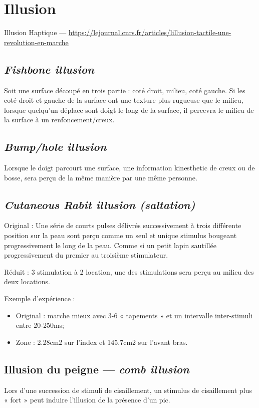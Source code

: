 \section{Illusion}
Illusion Haptique --- \url{https://lejournal.cnrs.fr/articles/lillusion-tactile-une-revolution-en-marche}\par

\subsection{ \textit{Fishbone illusion}}
Soit une surface découpé en trois partie : coté droit, milieu, coté gauche. Si les coté droit et gauche de la surface ont une texture plus rugueuse que le milieu, lorsque quelqu’un déplace sont doigt le long de la surface, il percevra le milieu de la surface à un renfoncement/creux.\par

\subsection{ \textit{Bump/hole illusion}}
Lorsque le doigt parcourt une surface, une information kinesthetic de creux ou de bosse, sera perçu de la même manière par une même personne.\par

\subsection{ \textit{Cutaneous Rabit illusion (saltation)}}
Original : Une série de courts pulses délivrés successivement à trois différente position sur la peau sont perçu comme un seul et unique stimulus bougeant progressivement le long de la peau. Comme si un petit lapin sautillée progressivement du premier au troisième stimulateur.\par
Réduit : 3 stimulation à 2 location, une des stimulations sera perçu au milieu des deux locations.\par
Exemple d’expérience :
\begin{itemize}
	\item Original : marche mieux avec 3-6 « tapements » et un intervalle inter-stimuli entre 20-250ms;
	\item Zone : 2.28cm2 sur l’index et 145.7cm2 sur l’avant bras.
\end{itemize}

\subsection{Illusion du peigne --- \textit{comb illusion}}
Lors d’une succession de stimuli de cisaillement, un stimulus de cisaillement plus « fort » peut induire l’illusion de la présence d’un pic.\par

